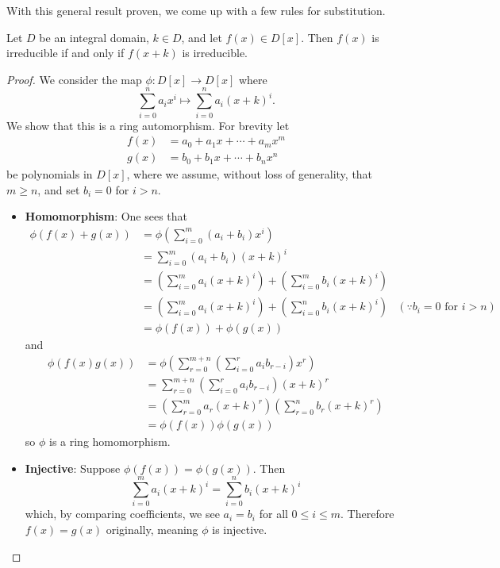 With this general result proven, we come up with a few rules for substitution.

\begin{corollary}\label{corollary-irreducible-iff-translation-is-irreducible}
    Let $D$ be an integral domain, $k \in D$, and let $f(x) \in D[x]$. Then $f(x)$ is irreducible if and only if $f(x + k)$ is irreducible.
\end{corollary}
\begin{proof}
    We consider the map $\phi: D[x] \to D[x]$ where
    \[
        \sum_{i=0}^n a_ix^i \mapsto \sum_{i=0}^na_i(x+k)^i.  
    \]
    We show that this is a ring automorphism. For brevity let
    \begin{align*}
        f(x) &= a_0 + a_1x + \cdots + a_mx^m\\
        g(x) &= b_0 + b_1x + \cdots + b_nx^n
    \end{align*}
    be polynomials in $D[x]$, where we assume, without loss of generality, that $m \geq n$, and set $b_i = 0$ for $i > n$.
    \begin{itemize}
        \item \textbf{Homomorphism}: One sees that
        \begin{align*}
            \phi(f(x) + g(x)) &= \phi\left(\sum_{i=0}^m(a_i+b_i)x^i\right)\\
            &= \sum_{i=0}^m(a_i+b_i)(x+k)^i\\
            &= \left(\sum_{i=0}^ma_i(x+k)^i\right) + \left(\sum_{i=0}^mb_i(x+k)^i\right)\\
            &= \left(\sum_{i=0}^ma_i(x+k)^i\right) + \left(\sum_{i=0}^nb_i(x+k)^i\right) & (\because b_i = 0 \text{ for } i > n)\\
            &= \phi(f(x)) + \phi(g(x))
        \end{align*}
        and
        \begin{align*}
            \phi(f(x)g(x)) &= \phi\left(\sum_{r=0}^{m+n}\left(\sum_{i=0}^ra_ib_{r-i}\right)x^r\right)\\
            &= \sum_{r=0}^{m+n}\left(\sum_{i=0}^ra_ib_{r-i}\right)(x+k)^r\\
            &= \left(\sum_{r=0}^ma_r(x+k)^r\right)\left(\sum_{r=0}^nb_r(x+k)^r\right)\\
            &= \phi(f(x))\phi(g(x))
        \end{align*}
        so $\phi$ is a ring homomorphism.
        
        \item \textbf{Injective}: Suppose $\phi(f(x)) = \phi(g(x))$. Then
        \[
            \sum_{i=0}^ma_i(x+k)^i = \sum_{i=0}^nb_i(x+k)^i
        \]
        which, by comparing coefficients, we see $a_i = b_i$ for all $0 \leq i \leq m$. Therefore $f(x) = g(x)$ originally, meaning $\phi$ is injective.
        

\end{itemize}
\end{proof}
